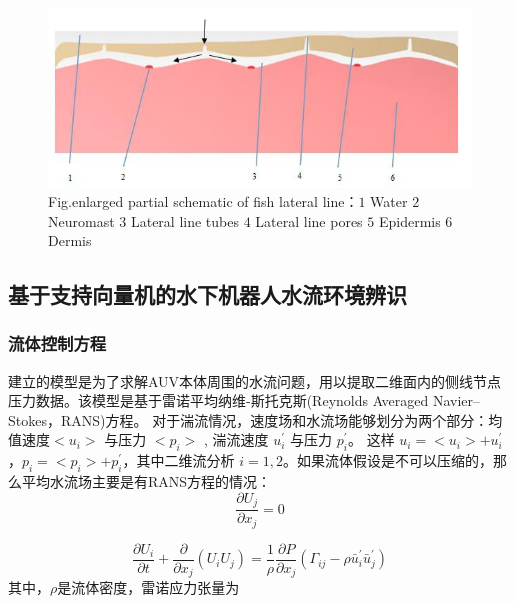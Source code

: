     \begin{figure}[!htp]
    \centering
        \includegraphics[width=14cm]{figure/chap3/fig2.jpg}
        \label{fig:chap3:F10}
         {Fig.}{enlarged partial schematic of fish lateral line：$1$ Water $2$  Neuromast  $3$ Lateral line tubes $4$ Lateral line pores $5$ Epidermis 6 Dermis  }
    \end{figure}

\subsection{基于支持向量机的水下机器人水流环境辨识  }

\subsubsection{流体控制方程 }
建立的模型是为了求解AUV本体周围的水流问题，用以提取二维面内的侧线节点压力数据。该模型是基于雷诺平均纳维-斯托克斯(Reynolds Averaged Navier–Stokes，RANS)方程。 对于湍流情况，速度场和水流场能够划分为两个部分：均值速度$<u_{i}>$ 与压力 $<p_{i}>$ , 湍流速度 $u_{i}^{'}$ 与压力 $p_{i}^{'}$。 这样 $u_{i} =  < u_{i} >  + u_{i}^{'}$ ，$p_{i} =< p_{i} >+p_{i}^{'}$，其中二维流分析 $i=1, 2$。如果流体假设是不可以压缩的，那么平均水流场主要是有RANS方程的情况：
\begin{equation}
\label{eq:chap3:14}
\frac{{\partial {U_j}}}{{\partial {x_j}}} = 0
\end{equation}

\begin{equation}
\label{eq:chap3:15}
\frac{{\partial {U_i}}}{{\partial t}} + \frac{\partial }{{\partial {x_j}}}\left( {{U_i}{U_j}} \right) = \frac{1}{\rho }\frac{{\partial P}}{{\partial {x_j}}}\left( {{\Gamma _{ij}} - \rho \bar u_i^{'}\bar u_j^{'}} \right)
\end{equation}
其中，$\rho$是流体密度，雷诺应力张量为\\

